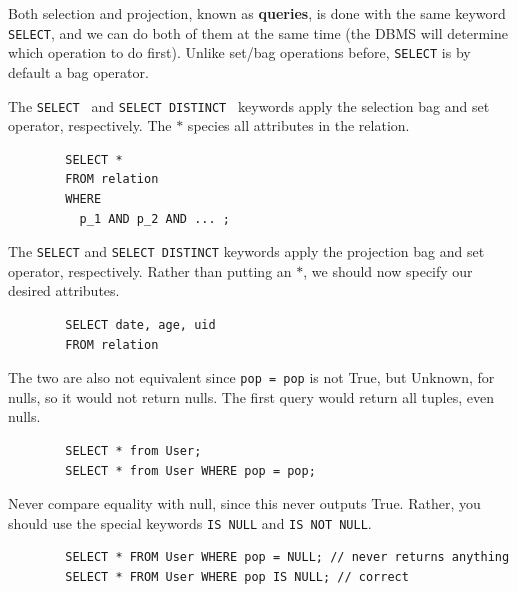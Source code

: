     Both selection and projection, known as \textbf{queries}, is done with the same keyword \texttt{SELECT}, and we can do both of them at the same time (the DBMS will determine which operation to do first). Unlike set/bag operations before, \texttt{SELECT} is by default a bag operator. 

    \begin{definition}[Selection]
      \label{def:selection-2}
      The \texttt{SELECT \*} and \texttt{SELECT DISTINCT \*} keywords apply the selection bag and set operator, respectively. The $\ast$ species all attributes in the relation. 
      \begin{lstlisting}
        SELECT * 
        FROM relation 
        WHERE 
          p_1 AND p_2 AND ... ; 
      \end{lstlisting}
    \end{definition} 

    \begin{definition}[Projection]
      \label{def:projection-2}
      The \texttt{SELECT} and \texttt{SELECT DISTINCT} keywords apply the projection bag and set operator, respectively. Rather than putting an $\ast$, we should now specify our desired attributes. 
      \begin{lstlisting}
        SELECT date, age, uid
        FROM relation 
      \end{lstlisting}
    \end{definition} 

    \begin{example}
      \label{ex:comparing-null-values-always-returns-null}
      The two are also not equivalent since \texttt{pop = pop} is not True, but Unknown, for nulls, so it would not return nulls. The first query would return all tuples, even nulls. 
      \begin{lstlisting}
        SELECT * from User; 
        SELECT * from User WHERE pop = pop; 
      \end{lstlisting}
    \end{example}

    \begin{example}
      \label{ex:never-compare-equality-with-null}
      Never compare equality with null, since this never outputs True. Rather, you should use the special keywords \texttt{IS NULL} and \texttt{IS NOT NULL}. 
      \begin{lstlisting}
        SELECT * FROM User WHERE pop = NULL; // never returns anything 
        SELECT * FROM User WHERE pop IS NULL; // correct 
      \end{lstlisting}
    \end{example}

